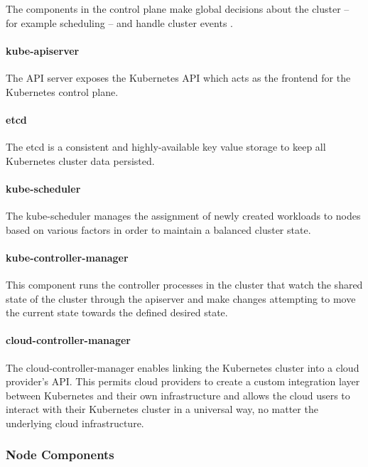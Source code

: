 The components in the control plane make global decisions about the cluster -- for example scheduling -- and handle cluster events \cite{KubernetesArchitecture}. 

\paragraph{kube-apiserver} The API server exposes the Kubernetes API which acts as the frontend for the Kubernetes control plane.

\paragraph{etcd} The etcd is a consistent and highly-available key value storage to keep all Kubernetes cluster data persisted.

\paragraph{kube-scheduler} The kube-scheduler manages the assignment of newly created workloads to nodes based on various factors in order to maintain a balanced cluster state.

\paragraph{kube-controller-manager} This component runs the controller processes in the cluster that watch the shared state of the cluster through the apiserver and make changes attempting to move the current state towards the defined desired state.

\paragraph{cloud-controller-manager} The cloud-controller-manager enables linking the Kubernetes cluster into a cloud provider's API. This permits cloud providers to create a custom integration layer between Kubernetes and their own infrastructure and allows the cloud users to interact with their Kubernetes cluster in a universal way, no matter the underlying cloud infrastructure.

\subsubsection{Node Components}

